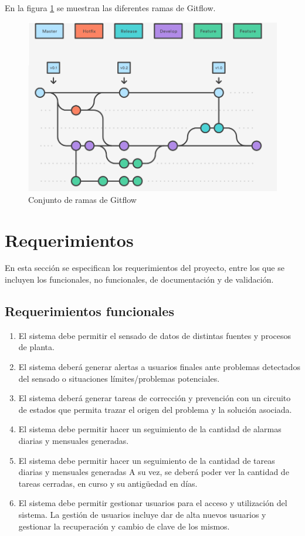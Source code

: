 En la figura \ref{fig:gitflow} se muestran las diferentes ramas de Gitflow.
 
\begin{figure}[ht]
	\centering
	\includegraphics[width=1\textwidth]{./Figures/gitflow.png}
	\caption{Conjunto de ramas de Gitflow}
	\label{fig:gitflow}
\end{figure}  

\pagebreak
\section{Requerimientos}\label{sec:Requerimientos}
 
En esta sección se especifican los requerimientos del proyecto, entre los que se incluyen los funcionales, no funcionales, de documentación y de validación.
 
\subsection{Requerimientos funcionales}
\begin{enumerate}[label=1.\arabic*]
\item El sistema debe permitir el sensado de datos de distintas fuentes y procesos de planta.
\item El sistema deberá generar alertas a usuarios finales ante problemas detectados del sensado o situaciones límites/problemas potenciales.
\item El sistema deberá generar tareas de corrección y prevención con un circuito de estados que permita trazar el origen del problema y la solución asociada.
\item El sistema debe permitir hacer un seguimiento de la cantidad de alarmas diarias y mensuales generadas.
\item El sistema debe permitir hacer un seguimiento de la cantidad de tareas diarias y mensuales generadas A su vez, se deberá poder ver la cantidad de tareas cerradas, en curso y su antigüedad en días.
\item El sistema debe permitir gestionar usuarios para el acceso y utilización del sistema. La gestión de usuarios incluye dar de alta nuevos usuarios y gestionar la recuperación y cambio de clave de los mismos.
\end{enumerate}
